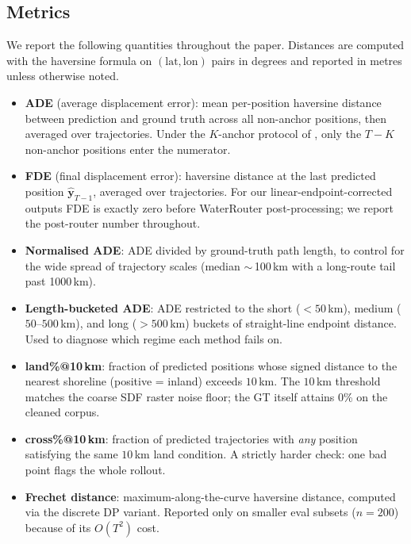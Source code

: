 \documentclass[11pt]{article}
\begin{document}
\subsection{Metrics}
\label{sec:metrics}

We report the following quantities throughout the paper. Distances are
computed with the haversine formula on $(\mathrm{lat}, \mathrm{lon})$ pairs
in degrees and reported in metres unless otherwise noted.

\begin{itemize}[leftmargin=*,topsep=2pt]
\item \textbf{ADE} (average displacement error): mean per-position
  haversine distance between prediction and ground truth across all
  non-anchor positions, then averaged over trajectories. Under the
  $K$-anchor protocol of , only the $T-K$ non-anchor
  positions enter the numerator.
\item \textbf{FDE} (final displacement error): haversine distance at the
  last predicted position $\hat{\mathbf{y}}_{T-1}$, averaged over
  trajectories. For our linear-endpoint-corrected outputs FDE is exactly
  zero before WaterRouter post-processing; we report the post-router
  number throughout.
\item \textbf{Normalised ADE}: ADE divided by ground-truth path length,
  to control for the wide spread of trajectory scales (median $\sim$\,100\,km
  with a long-route tail past 1000\,km).
\item \textbf{Length-bucketed ADE}: ADE restricted to the short
  ($<\!50$\,km), medium ($50$--$500$\,km), and long ($>\!500$\,km) buckets
  of straight-line endpoint distance. Used to diagnose which regime each
  method fails on.
\item \textbf{land\%@10\,km}: fraction of predicted positions whose
  signed distance to the nearest shoreline (positive = inland) exceeds
  $10$\,km. The $10$\,km threshold matches the coarse SDF raster noise
  floor; the GT itself attains $0$\% on the cleaned corpus.
\item \textbf{cross\%@10\,km}: fraction of predicted trajectories with
  \emph{any} position satisfying the same $10$\,km land condition. A
  strictly harder check: one bad point flags the whole rollout.
\item \textbf{Frechet distance}: maximum-along-the-curve haversine
  distance, computed via the discrete DP variant. Reported only on
  smaller eval subsets ($n=200$) because of its $O(T^2)$ cost.
\end{itemize}
\end{document}
